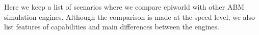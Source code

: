 Here we keep a list of scenarios where we compare epiworld with other ABM simulation engines. Although the comparison is made at the speed level, we also list features of capabilities and main differences between the engines. 